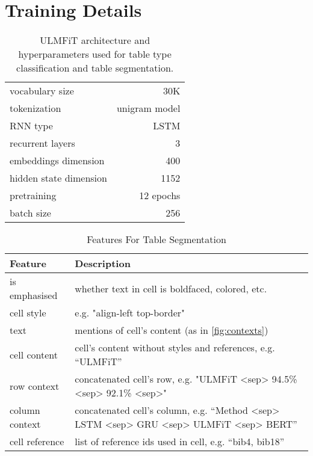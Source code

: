 \documentclass[11pt,a4paper]{article}
\begin{document}
\section{Training Details}
\begin{table}[H]
    \centering
    \setlength{\tabcolsep}{8pt}
    \caption{ULMFiT architecture and hyperparameters used for table type classification and table segmentation.}
    \label{tab:ulmfit}
    \begin{tabular}{lr}
     \toprule
     vocabulary size & 30K\\
     tokenization & unigram model\\
     RNN type & LSTM\\
     recurrent layers & 3\\
     embeddings dimension & 400\\
     hidden state dimension & 1152\\
     pretraining & 12 epochs\\
     batch size & 256\\
     \bottomrule
    \end{tabular}
\end{table}


\begin{table}[H]
\tiny
    \centering
    \setlength{\tabcolsep}{4pt}
    \caption{Features For Table Segmentation}
    \label{tab:table-structure:features}
    \begin{tabular}{l|p{5cm}}
     \toprule
     Feature & Description\\\midrule
is emphasised & whether text in cell is boldfaced, colored, etc.\\
cell style & e.g. "align-left top-border"\\
text & mentions of cell’s content (as in \cref{fig:contexts})\\
cell content & cell's content without styles and references, e.g. “ULMFiT” \\
row context & concatenated cell's row, e.g. "ULMFiT <sep> 94.5\% <sep> 92.1\% <sep>" \\
column context & concatenated cell’s column, e.g. “Method <sep> LSTM <sep> GRU <sep> ULMFiT <sep> BERT”\\
cell reference & list of reference ids used in cell, e.g. “bib4, bib18”\\
\bottomrule
\end{tabular}
\end{table}
\end{document}
